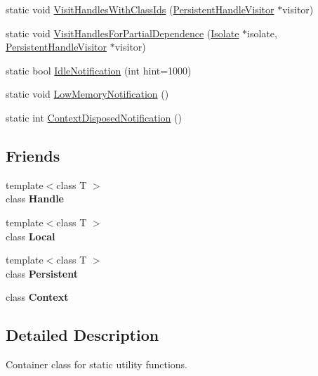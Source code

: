 \begin{DoxyCompactItemize}
static void \hyperlink{classv8_1_1_v8_a5bf6f26e51cd3e9d71a662fe7efa5206}{Visit\+Handles\+With\+Class\+Ids} (\hyperlink{classv8_1_1_persistent_handle_visitor}{Persistent\+Handle\+Visitor} $\ast$visitor)
\item 
static void \hyperlink{classv8_1_1_v8_ab2e242c45c73a0cee755e55acec71bd5}{Visit\+Handles\+For\+Partial\+Dependence} (\hyperlink{classv8_1_1_isolate}{Isolate} $\ast$isolate, \hyperlink{classv8_1_1_persistent_handle_visitor}{Persistent\+Handle\+Visitor} $\ast$visitor)
\item 
static bool \hyperlink{classv8_1_1_v8_abcafb07ace99c980e42662299eb9eb1d}{Idle\+Notification} (int hint=1000)
\item 
static void \hyperlink{classv8_1_1_v8_a7df118b9667d04903f8e9fb7452fd1ac}{Low\+Memory\+Notification} ()
\item 
static int \hyperlink{classv8_1_1_v8_a06126bd2345c086a376f934ec1fbcce6}{Context\+Disposed\+Notification} ()
\end{DoxyCompactItemize}
\subsection*{Friends}
\begin{DoxyCompactItemize}
\item 
\hypertarget{classv8_1_1_v8_a67ca1a2d91273eaf85fb3d23ba8ce984}{}{\footnotesize template$<$class T $>$ }\\class {\bfseries Handle}\label{classv8_1_1_v8_a67ca1a2d91273eaf85fb3d23ba8ce984}

\item 
\hypertarget{classv8_1_1_v8_afb872edb4aac7ba55f0da004113aa2b0}{}{\footnotesize template$<$class T $>$ }\\class {\bfseries Local}\label{classv8_1_1_v8_afb872edb4aac7ba55f0da004113aa2b0}

\item 
\hypertarget{classv8_1_1_v8_afaadbbd2553180545a4e018c3eeac71e}{}{\footnotesize template$<$class T $>$ }\\class {\bfseries Persistent}\label{classv8_1_1_v8_afaadbbd2553180545a4e018c3eeac71e}

\item 
\hypertarget{classv8_1_1_v8_ac26c806e60ca4a0547680edb68f6e39b}{}class {\bfseries Context}\label{classv8_1_1_v8_ac26c806e60ca4a0547680edb68f6e39b}

\end{DoxyCompactItemize}


\subsection{Detailed Description}
Container class for static utility functions. 

